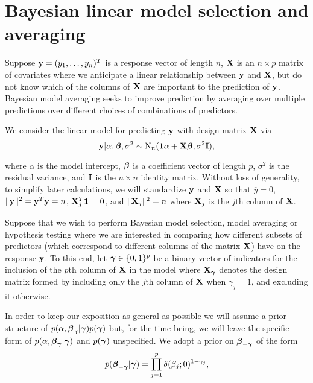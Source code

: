 \section{Bayesian linear model selection and averaging}
\label{sec:bma}

Suppose ${\bf y} = (y_1,\ldots,y_n)^T$ is a response vector of length $n$, ${\bf X}$ is
an $n \times p$ matrix of covariates where we anticipate a linear relationship
between ${\bf y}$ and ${\bf X}$, but do not know which of the columns of ${\bf X}$ are
important to the prediction of ${\bf y}$.  Bayesian model averaging seeks to
improve prediction by averaging over multiple predictions over different
choices of combinations of predictors.

We consider the linear model for predicting ${\bf y}$ with design matrix ${\bf X}$ via
\begin{equation}
	\label{eq:linearModel}
	{\bf y} | \alpha, {\boldsymbol \beta}, \sigma^2 \sim \text{N}_n({\bf 1}\alpha + {\bf X} {\boldsymbol \beta}, \sigma^2 {\bf I}),
\end{equation} 


\noindent where $\alpha$ is the model intercept, ${\boldsymbol \beta}$ is a coefficient
vector of length $p$, $\sigma^2$ is the residual variance, and ${\bf I}$ is the $n
\times n$ identity matrix.  Without loss of generality, to simplify later
calculations, we will standardize ${\bf y}$ and ${\bf X}$ so that $\overline{y} = 0$,
$\|{\bf y}\|^2 = {\bf y}^T{\bf y} = n$, ${\bf X}_j^T{\bf 1} = 0$,  and $\|{\bf X}_j\|^2 = n$ where
${\bf X}_j$ is the $j$th column of ${\bf X}$. 


Suppose that we wish to perform Bayesian model selection, model averaging or
hypothesis testing where we are interested in comparing how different subsets
of predictors (which correspond to different columns of the matrix ${\bf X}$) have
on the response ${\bf y}$. To this end, let ${\boldsymbol \gamma} \in \{0, 1\}^p$ be a binary
vector of indicators for the inclusion of the $p$th column of ${\bf X}$ in the
model where ${\bf X}_{\boldsymbol \gamma}$ denotes the design matrix formed by including only
the $j$th column of ${\bf X}$ when $\gamma_j = 1$, and excluding it otherwise. 

In order to keep our exposition as general as possible we will assume a prior
structure of $p(\alpha,{\boldsymbol \beta}_{{\boldsymbol \gamma}}|{\boldsymbol \gamma})p({\boldsymbol \gamma})$ but, for the time
being, we will leave the specific form of $p(\alpha,{\boldsymbol \beta}_{{\boldsymbol \gamma}}|{\boldsymbol \gamma})$
and $p({\boldsymbol \gamma})$ unspecified.  We adopt a prior on ${\boldsymbol \beta}_{-{\boldsymbol \gamma}}$  of the
form
\begin{equation}
	\label{eq:spikeAndSlab}
	\displaystyle p({\boldsymbol \beta}_{-{\boldsymbol \gamma}}|{\boldsymbol \gamma}) = \prod_{j=1}^p \delta(\beta_j;0)^{1-\gamma_j},
\end{equation} 

